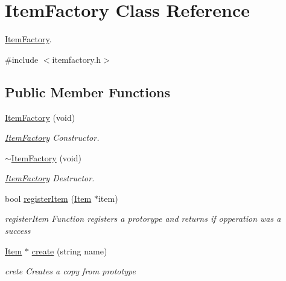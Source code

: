 \hypertarget{class_item_factory}{\section{\-Item\-Factory \-Class \-Reference}
\label{class_item_factory}
}


\hyperlink{class_item_factory}{\-Item\-Factory}.  




{\ttfamily \#include $<$itemfactory.\-h$>$}

\subsection*{\-Public \-Member \-Functions}
\begin{DoxyCompactItemize}
\item 
\hyperlink{class_item_factory_a085a6786b8f4eb155cc224ee53ffeb2e}{\-Item\-Factory} (void)
\begin{DoxyCompactList}\small\item\em \hyperlink{class_item_factory}{\-Item\-Factory} \-Constructor. \end{DoxyCompactList}\item 
\hypertarget{class_item_factory_a2ac7c546a9d55c856b37660f677cb47e}{\hyperlink{class_item_factory_a2ac7c546a9d55c856b37660f677cb47e}{$\sim$\-Item\-Factory} (void)}\label{class_item_factory_a2ac7c546a9d55c856b37660f677cb47e}

\begin{DoxyCompactList}\small\item\em \hyperlink{class_item_factory}{\-Item\-Factory} \-Destructor. \end{DoxyCompactList}\item 
bool \hyperlink{class_item_factory_a4cb3694e6cd7e29d399244fe17488925}{register\-Item} (\hyperlink{class_item}{\-Item} $\ast$item)
\begin{DoxyCompactList}\small\item\em register\-Item \-Function registers a protorype and returns if opperation was a success \end{DoxyCompactList}\item 
\hyperlink{class_item}{\-Item} $\ast$ \hyperlink{class_item_factory_a90b32f0fd5b11e2eb4d19b4faaf8adb8}{create} (string name)
\begin{DoxyCompactList}\small\item\em crete \-Creates a copy from prototype \end{DoxyCompactList}\end{DoxyCompactItemize}


